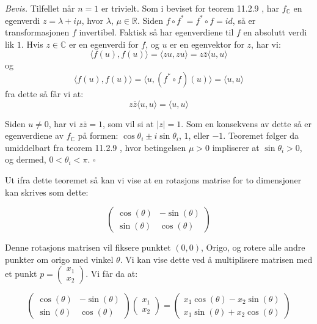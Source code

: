 \documentclass[a4paper,10pt,english]{article}
\begin{document}
    \textit{Bevis.} Tilfellet når $n = 1$ er trivielt. Som i beviset for teorem 11.2.9 \cite{GMA}, har $f_{\mathbb{C}}$ en egenverdi $z = \lambda+i\mu$, hvor $\lambda$, $\mu \in \mathbb{R}$.
                    Siden $f \circ f^{*} = f^{*} \circ f = id$, så er transformasjonen $f$ invertibel. Faktisk så har egenverdiene til $f$ en absolutt verdi lik $1$.
                    Hvis $z \in \mathbb{C}$ er en egenverdi for $f$, og $u$ er en egenvektor for $z$, har vi:
                    $$
                    \langle f(u), f(u) \rangle = \langle zu, zu \rangle = z \bar{z} \langle u, u \rangle
                    $$
                    og
                    $$
                    \langle f(u), f(u) \rangle = \langle u, (f^{*} \circ f)(u) \rangle = \langle u, u \rangle
                    $$
                    fra dette så får vi at:
                    $$
                    z \bar{z} \langle u, u \rangle = \langle u, u \rangle
                    $$

                    Siden $u \neq 0$, har vi $z \bar{z} = 1$, som vil si at $\lvert z \rvert = 1$. Som en konsekvens av dette så er egenverdiene av $f_{\mathbb{C}}$ på formen: $\cos\theta_{i} \pm i\sin\theta_{i}$, $1$, eller $-1$.
                    Teoremet følger da umiddelbart fra teorem 11.2.9 \cite{GMA}, hvor betingelsen $\mu > 0$ impliserer at $\sin \theta_{i} > 0$, og dermed, $0 < \theta_{i} < \pi$. $\square$

    Ut ifra dette teoremet så kan vi vise at en rotasjons matrise for to dimensjoner kan skrives som dette:
                
    $$
    \left(
    \begin{matrix}
        \cos(\theta) & -\sin(\theta) \\
        \sin(\theta) &  \cos(\theta)
    \end{matrix}
    \right)
    $$
            
    Denne rotasjons matrisen vil fiksere punktet $\left( 0, 0 \right)$, Origo, og rotere alle andre punkter om origo med vinkel $\theta$.
    Vi kan vise dette ved å multiplisere matrisen med et punkt $p = \left( \begin{smallmatrix} x_{1} \\ x_{2} \end{smallmatrix} \right)$. Vi får da at:

    $$
    \left(
    \begin{matrix}
        \cos(\theta) & -\sin(\theta) \\
        \sin(\theta) &  \cos(\theta)
    \end{matrix}
    \right)
    \left(
    \begin{matrix}
        x_{1} \\ x_{2}
    \end{matrix}
    \right) = 
    \left(
    \begin{matrix}
        x_{1}\cos(\theta) - x_{2}\sin(\theta) \\
        x_{1}\sin(\theta) + x_{2}\cos(\theta)
    \end{matrix}
    \right)
    $$
\end{document}
